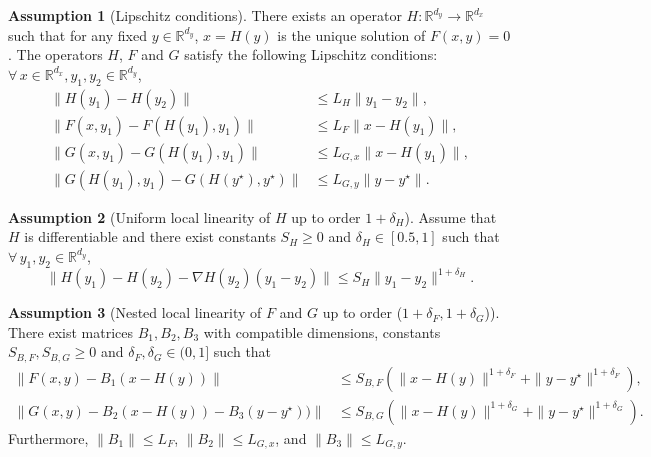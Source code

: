 \documentclass[11pt]{article}
\theoremstyle{plain}
\theoremstyle{definition}
\newtheorem{assump}{Assumption}[section]
\def\LGx{{L}_{G,x}}
\def\LGy{{L}_{G,y}}
\def\Hsmooth{{\delta_H}}
\def\Fsmooth{{\delta_F}}
\def\Gsmooth{{\delta_G}}
\def\nablaH{\nabla H}
\def\SBF{{S}_{B,F}}
\def\SBG{{S}_{B,G}}
\def\RB{{\mathbb R}}
\begin{document}
\begin{assump}[Lipschitz conditions]
	\label{assump:smooth}
	There exists an operator $H\colon \RB^{d_y}\rightarrow\RB^{d_x}$ such that for any fixed $y\in\RB^{d_y}$, $x = H(y)$ is the unique solution of
		$F(x,y) = 0$.    
	The operators $H$, $F$ and $G$ satisfy the following Lipschitz conditions: 
	$\forall\, x \in \RB^{d_x}, y_{1}, y_{2} \in\RB^{d_y}$,
	\begin{align}
		\|H(y_{1}) - H(y_{2})\| & \leq L_{H}\|y_{1}-y_{2}\|,\label{assump:smooth:FH:ineqH}\\
		\|F(x,y_1) - F(H(y_1),y_1)\| & \leq L_{F} \|x - H(y_1) \|, \nonumber    
		\\
		\|G(x,y_{1}) - G(H(y_{1}),y_{1})\| & \leq \LGx \|x - H(y_{1})\|, \nonumber 
		\\   
		\| G(H(y_{1}),y_{1}) - G(H(y^\star), y^\star) \| & \leq \LGy \| y - y^\star \|. \nonumber 
	\end{align}	
\end{assump}

\begin{assump}
	[Uniform local linearity of $H$ up to order $1+\Hsmooth$]
	 \label{assump:smoothH}
	Assume that $H$ is differentiable and there exist 
	constants $S_H \ge 0$ and $\Hsmooth \in [0.5, 1]$ such that $\forall\, y_1, y_2 \in \RB^{d_y}$,
	\begin{equation*}
		\| H(y_1) -  H(y_2) - \nablaH(y_2) (y_1-y_2)  \| \le  S_H  \|y_1-y_2\|^{1+\Hsmooth}.
	\end{equation*}
\end{assump}

\begin{assump}[Nested local linearity of $F$ and $G$ up to order ($1+\Fsmooth, 1+\Gsmooth$)]
	\label{assump:near-linear}
	There exist matrices $B_1, B_2, B_3$ with compatible dimensions, constants $\SBF, \SBG \ge 0$ and $\Fsmooth, \Gsmooth \in (0,1]$ such that
	\begin{align}
		\|F(x, y) - B_1(x {-} H(y))\| &\le \SBF \left( \|x {-} H(y)\|^{1+\Fsmooth} +  \|y {-} y^{\star}\|^{1+\Fsmooth} \right),
		\label{assump:near-linear-F}
		\\
		\|G(x, y) - B_2(x {-} H(y))- B_3(y {-} y^{\star}) )\| &\le \SBG \left( \|x {-} H(y)\|^{1+\Gsmooth} + \|y {-} y^{\star}\|^{1+\Gsmooth} \right). 
		\label{assump:near-linear-G}
	\end{align}
	Furthermore, $\|B_1\| \le L_F$, $\| B_2\| \le \LGx$, and $\|B_3\|\le \LGy$. 
\end{assump}
\end{document}
